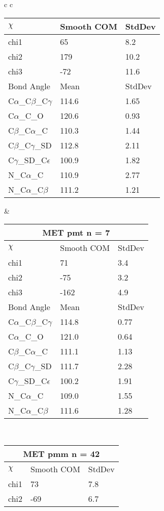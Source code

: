 \begin{longtable}{ c c }
\begin{tabular}{ l l l }
  $\chi$       & Smooth COM & StdDev \\ \midrule
  chi1 & 65 & 8.2 \\ 
  chi2 & 179 & 10.2 \\ 
  chi3 & -72 & 11.6 \\ \midrule
  Bond Angle   & Mean     & StdDev \\ \midrule
  C$\alpha$\_C$\beta$\_C$\gamma$ & 114.6 & 1.65\\
  C$\alpha$\_C\_O & 120.6 & 0.93\\
  C$\beta$\_C$\alpha$\_C & 110.3 & 1.44\\
  C$\beta$\_C$\gamma$\_SD & 112.8 & 2.11\\
  C$\gamma$\_SD\_C$\epsilon$ & 100.9 & 1.82\\
  N\_C$\alpha$\_C & 110.9 & 2.77\\
  N\_C$\alpha$\_C$\beta$ & 111.2 & 1.21\\
  \bottomrule
  \end{tabular}
  &
  \begin{tabular}{ l l l }
  \toprule
  \multicolumn{3}{c}{MET \textbf{pmt} n = 7} \\ \toprule
  $\chi$       & Smooth COM & StdDev \\ \midrule
  chi1 & 71 & 3.4 \\ 
  chi2 & -75 & 3.2 \\ 
  chi3 & -162 & 4.9 \\ \midrule
  Bond Angle   & Mean     & StdDev \\ \midrule
  C$\alpha$\_C$\beta$\_C$\gamma$ & 114.8 & 0.77\\
  C$\alpha$\_C\_O & 121.0 & 0.64\\
  C$\beta$\_C$\alpha$\_C & 111.1 & 1.13\\
  C$\beta$\_C$\gamma$\_SD & 111.7 & 2.28\\
  C$\gamma$\_SD\_C$\epsilon$ & 100.2 & 1.91\\
  N\_C$\alpha$\_C & 109.0 & 1.55\\
  N\_C$\alpha$\_C$\beta$ & 111.6 & 1.28\\
  \bottomrule
  \end{tabular}
  \\
  \begin{tabular}{ l l l }
  \toprule
  \multicolumn{3}{c}{MET \textbf{pmm} n = 42} \\ \toprule
  $\chi$       & Smooth COM & StdDev \\ \midrule
  chi1 & 73 & 7.8 \\ 
  chi2 & -69 & 6.7 \\ 

\end{tabular}
\end{longtable}
